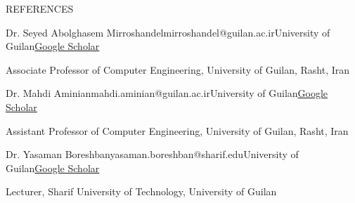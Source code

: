 \documentclass[]{CV}
\begin{document}
\begin{section}{REFERENCES}
\begin{subsectionnobullet}{Dr. Seyed Abolghasem Mirroshandel}{mirroshandel@guilan.ac.ir}{University of Guilan}{\href{https://scholar.google.com/citations?user=WGH3eIsAAAAJ&hl=en}{Google Scholar}}
    \item {Associate Professor of Computer Engineering, University of Guilan, Rasht, Iran}
\end{subsectionnobullet}

\begin{subsectionnobullet}{Dr. Mahdi Aminian}{mahdi.aminian@guilan.ac.ir}{University of Guilan}{\href{https://scholar.google.com/citations?user=YVxXqIAAAAAJ&hl=en}{Google Scholar}}
\item {Assistant Professor of Computer Engineering, University of Guilan, Rasht, Iran}
\end{subsectionnobullet}


\begin{subsectionnobullet}{Dr. Yasaman Boreshban}{yasaman.boreshban@sharif.edu}{University of Guilan}{\href{https://scholar.google.com/citations?hl=en&user=dKskDg8AAAAJ&hl=en}{Google Scholar}}
\item {Lecturer, Sharif University of Technology, University of Guilan}
\end{subsectionnobullet}


\end{section}
\end{document}
